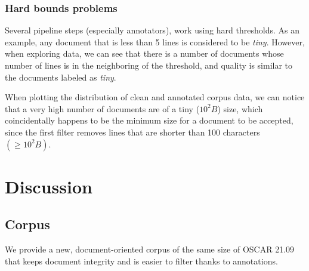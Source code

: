 



\subsubsection{Hard bounds problems}

Several pipeline steps (especially annotators), work using hard thresholds. As an example, any document that is less than 5 lines is considered to be \textit{tiny}. However, when exploring data, we can see that there is a number of documents whose number of lines is in the neighboring of the threshold, and quality is similar to the documents labeled as \textit{tiny}.

When plotting the distribution of clean and annotated corpus data, we can notice that a very high number of documents are of a tiny ($10^2 B$) size, which coincidentally happens to be the minimum size for a document to be accepted, since the first filter removes lines that are shorter than 100 characters $(\geq 10^2 B)$.


\section{Discussion}


\subsection{Corpus}
We provide a new, document-oriented corpus of the same size of OSCAR 21.09 that keeps document integrity and is easier to filter thanks to annotations.

